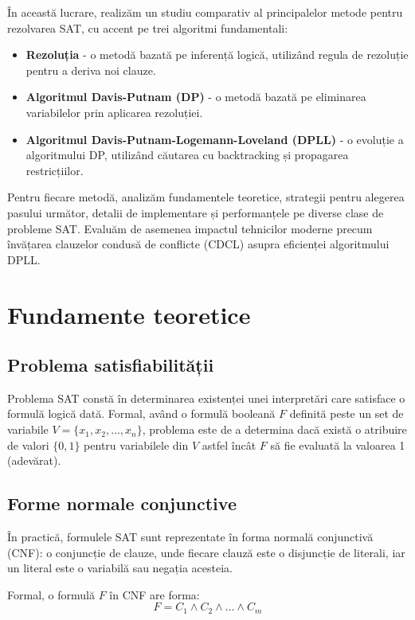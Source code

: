 \documentclass[a4paper,10pt]{article}
\begin{document}
În această lucrare, realizăm un studiu comparativ al principalelor metode pentru rezolvarea SAT, cu accent pe trei algoritmi fundamentali:

\begin{itemize}
    \item \textbf{Rezoluția} - o metodă bazată pe inferență logică, utilizând regula de rezoluție pentru a deriva noi clauze.
    \item \textbf{Algoritmul Davis-Putnam (DP)} - o metodă bazată pe eliminarea variabilelor prin aplicarea rezoluției.
    \item \textbf{Algoritmul Davis-Putnam-Logemann-Loveland (DPLL)} - o evoluție a algoritmului DP, utilizând căutarea cu backtracking și propagarea restricțiilor.
\end{itemize}

Pentru fiecare metodă, analizăm fundamentele teoretice, strategii pentru alegerea pasului următor, detalii de implementare și performanțele pe diverse clase de probleme SAT. Evaluăm de asemenea impactul tehnicilor moderne precum învățarea clauzelor condusă de conflicte (CDCL) asupra eficienței algoritmului DPLL.

\section{Fundamente teoretice}

\subsection{Problema satisfiabilității}

Problema SAT constă în determinarea existenței unei interpretări care satisface o formulă logică dată. Formal, având o formulă booleană $F$ definită peste un set de variabile $V = \{x_1, x_2, \ldots, x_n\}$, problema este de a determina dacă există o atribuire de valori $\{0,1\}$ pentru variabilele din $V$ astfel încât $F$ să fie evaluată la valoarea 1 (adevărat).

\subsection{Forme normale conjunctive}

În practică, formulele SAT sunt reprezentate în forma normală conjunctivă (CNF): o conjuncție de clauze, unde fiecare clauză este o disjuncție de literali, iar un literal este o variabilă sau negația acesteia.

Formal, o formulă $F$ în CNF are forma:
\begin{equation}
F = C_1 \land C_2 \land \ldots \land C_m
\end{equation}
\end{document}
